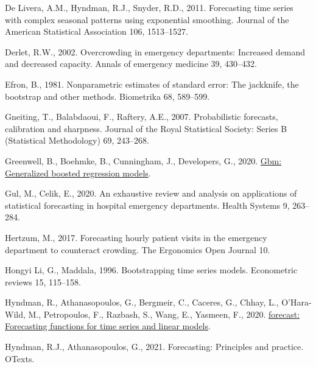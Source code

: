 \documentclass[]{elsarticle} %
\newlength{\cslhangindent}
\newlength{\cslentryspacingunit} %
\newenvironment{CSLReferences}[2] %
 {%
  \setlength{\parindent}{0pt}
  \ifodd #1
  \let\oldpar\par
  \def\par{\hangindent=\cslhangindent\oldpar}
  \fi
  \setlength{\parskip}{#2\cslentryspacingunit}
 }%
 {}
\begin{document}
\begin{CSLReferences}{1}{0}
\leavevmode{}%
De Livera, A.M., Hyndman, R.J., Snyder, R.D., 2011. Forecasting time series with complex seasonal patterns using exponential smoothing. Journal of the American Statistical Association 106, 1513--1527.

\leavevmode{}%
Derlet, R.W., 2002. Overcrowding in emergency departments: Increased demand and decreased capacity. Annals of emergency medicine 39, 430--432.

\leavevmode{}%
Efron, B., 1981. Nonparametric estimates of standard error: The jackknife, the bootstrap and other methods. Biometrika 68, 589--599.

\leavevmode{}%
Gneiting, T., Balabdaoui, F., Raftery, A.E., 2007. Probabilistic forecasts, calibration and sharpness. Journal of the Royal Statistical Society: Series B (Statistical Methodology) 69, 243--268.

\leavevmode{}%
Greenwell, B., Boehmke, B., Cunningham, J., Developers, G., 2020. \href{https://CRAN.R-project.org/package=gbm}{Gbm: Generalized boosted regression models}.

\leavevmode{}%
Gul, M., Celik, E., 2020. An exhaustive review and analysis on applications of statistical forecasting in hospital emergency departments. Health Systems 9, 263--284.

\leavevmode{}%
Hertzum, M., 2017. Forecasting hourly patient visits in the emergency department to counteract crowding. The Ergonomics Open Journal 10.

\leavevmode{}%
Hongyi Li, G., Maddala, 1996. Bootstrapping time series models. Econometric reviews 15, 115--158.

\leavevmode{}%
Hyndman, R., Athanasopoulos, G., Bergmeir, C., Caceres, G., Chhay, L., O'Hara-Wild, M., Petropoulos, F., Razbash, S., Wang, E., Yasmeen, F., 2020. \href{http://pkg.robjhyndman.com/forecast}{{forecast}: Forecasting functions for time series and linear models}.

\leavevmode{}%
Hyndman, R.J., Athanasopoulos, G., 2021. Forecasting: Principles and practice. OTexts.


\end{CSLReferences}
\end{document}

